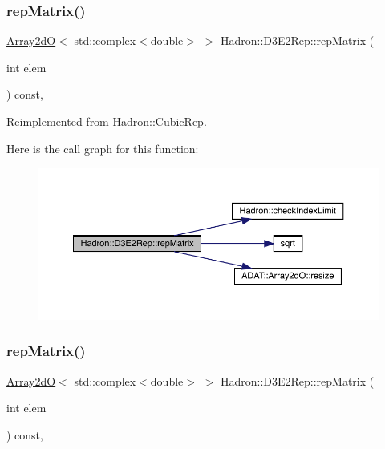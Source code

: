 \subsubsection{\texorpdfstring{repMatrix()}{repMatrix()}\hspace{0.1cm}{\footnotesize\ttfamily [1/2]}}
{\footnotesize\ttfamily \mbox{\hyperlink{classADAT_1_1Array2dO}{Array2dO}}$<$ std\+::complex$<$double$>$ $>$ Hadron\+::\+D3\+E2\+Rep\+::rep\+Matrix (\begin{DoxyParamCaption}\item[{int}]{elem }\end{DoxyParamCaption}) const\hspace{0.3cm}{\ttfamily [inline]}, {\ttfamily [virtual]}}



Reimplemented from \mbox{\hyperlink{structHadron_1_1CubicRep_ac5d7e9e6f4ab1158b5fce3e4ad9e8005}{Hadron\+::\+Cubic\+Rep}}.

Here is the call graph for this function\+:
\nopagebreak
\begin{figure}[H]
\begin{center}
\leavevmode
\includegraphics[width=350pt]{db/de8/structHadron_1_1D3E2Rep_a941daa264ff6a6495a1bb521abe9021b_cgraph}
\end{center}
\end{figure}
\mbox{\label{structHadron_1_1D3E2Rep_a941daa264ff6a6495a1bb521abe9021b}} 
\subsubsection{\texorpdfstring{repMatrix()}{repMatrix()}\hspace{0.1cm}{\footnotesize\ttfamily [2/2]}}
{\footnotesize\ttfamily \mbox{\hyperlink{classADAT_1_1Array2dO}{Array2dO}}$<$ std\+::complex$<$double$>$ $>$ Hadron\+::\+D3\+E2\+Rep\+::rep\+Matrix (\begin{DoxyParamCaption}\item[{int}]{elem }\end{DoxyParamCaption}) const\hspace{0.3cm}{\ttfamily [inline]}, {\ttfamily [virtual]}}



